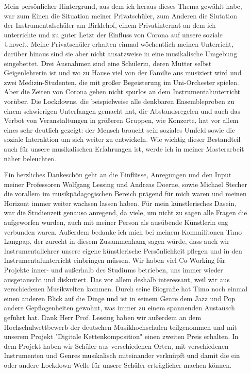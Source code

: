 
Mein persönlicher Hintergrund, aus dem ich heraus dieses Thema gewählt habe, war
zum Einen die Situation meiner Privatschüler, zum Anderen die Siutation der
Instrumentalschüler am Birklehof, einem Privatinternat an dem ich unterrichte
und zu guter Letzt der Einfluss von Corona auf unsere soziale Umwelt. Meine
Privatschüler erhalten einmal wöchentlich meinen Unterricht, darüber hinaus sind
sie aber nicht ansatzweise in eine musikalische Umgebung eingebettet. Drei
Ausnahmen sind eine Schülerin, deren Mutter selbst Geigenlehrerin ist und wo zu
Hause viel von der Familie aus musiziert wird und zwei Medizin-Studenten, die
mit großer Begeisterung im Uni-Orchester spielen. Aber die Zeiten von Corona
gehen nicht spurlos an dem Instrumentalunterricht vorüber. Die Lockdowns, die
beispielweise alle denkbaren Ensembleproben zu einem schwierigen Unterfangen
gemacht hat, die Abstandsregelen und auch das Verbot von Veranstaltungen in
größeren Gruppen, wie Konzerte, hat vor allem eines sehr deutlich gezeigt: der
Mensch braucht sein soziales Umfeld sowie die soziale Interaktion um sich weiter
zu entwickeln. Wie wichtig dieser Bestandteil auch für unsere musikalischen
Erfahrungen ist, werde ich in meiner Masterarbeit näher beleuchten.

Ein herzliches Dankeschön geht an die Einflüsse, Anregungen und den Input meiner
Professoren Wolfgang Lessing und Andreas Doerne, sowie Michael Stecher die
vorallem im musikpädagogischen Bereich prägend für mich waren und meinen
Horizont immer weiter wachsen lassen haben. Für mein künstlerisches Dasein, war
die Studienzeit genauso anregend, da viele, um nicht zu sagen alle Fragen die
aufgeworfen wurden, auch mit meiner Person als ausübende Künstlerin eng
verbunden waren. Außerdem bedanke ich mich bei meinem Kommilitonen Timo Langpap,
der zurecht in diesem Zusammenhang sagen würde, dass auch wir Instrumentallehrer
unsere eigene künstlerische Persönlichkeit pflegen und in den
Instrumentalunterricht einbringen müssen. Wir haben viel Co-Working für Projekte
inner- und außerhalb des Studiums betrieben, uns immer wieder ausgetauscht und
diskutiert. Das vor allem deshalb interessant, weil wir aus verschiedenen
Musikwelten kommen. Durch seine Biografie hat Timo noch einmal einen anderen
Blick auf die Dinge und ist in seinem Genre dem Jazz und Pop andere
Gepflogenheiten gewohnt, was immer zu einem spannenden Austausch geführt hat.
Dank Herr Prof. Lessing haben wir außerdem an dem Hochschulwettbewerb der
deutschen Musikhochschulen teilgenommen und mit unserem Projekt "Digitale
Kettenkomposition" einen zweiten Preis erhalten. In dem Projekt haben wir
Schüler aus verschiedenen Orten, mit verschiedenen Instrumenten und Genres
musikalisch miteinander verknüpft und damit die ein oder andere Lockdown-Welle
für unsere Schüler erträglicher machen können. 

